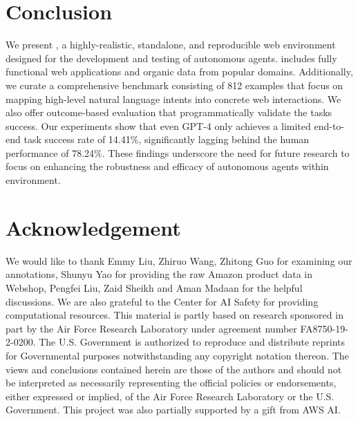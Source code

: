 \documentclass{article}
\begin{document}
\section{Conclusion}
We present \ours, a highly-realistic, standalone, and reproducible web environment designed for the development and testing of autonomous agents. \ours includes fully functional web applications and organic data from popular domains.
Additionally, we curate a comprehensive benchmark consisting of 812 examples that focus on mapping high-level natural language intents into concrete web interactions. We also offer outcome-based evaluation that programmatically validate the tasks success.
Our experiments show that even \textsc{GPT-4} only achieves a limited end-to-end task success rate of 14.41\%, significantly lagging behind the human performance of 78.24\%. These findings underscore the need for future research to focus on enhancing the robustness and efficacy of autonomous agents within \ours environment. 

\section*{Acknowledgement}
We would like to thank Emmy Liu, Zhiruo Wang, Zhitong Guo for examining our annotations, Shunyu Yao for providing the raw Amazon product data in Webshop, Pengfei Liu, Zaid Sheikh and Aman Madaan for the helpful discussions.
We are also grateful to the Center for AI Safety for providing computational resources.
This material is partly based on research sponsored in part by the Air Force Research Laboratory under agreement number FA8750-19-2-0200. The U.S. Government is authorized to reproduce and distribute reprints for Governmental purposes notwithstanding any copyright notation thereon. The views and conclusions contained herein are those of the authors and should not be interpreted as necessarily representing the official policies or endorsements, either expressed or implied, of the Air Force Research Laboratory or the U.S. Government. This project was also partially supported by a gift from AWS AI.






\clearpage

\appendix

\end{document}
